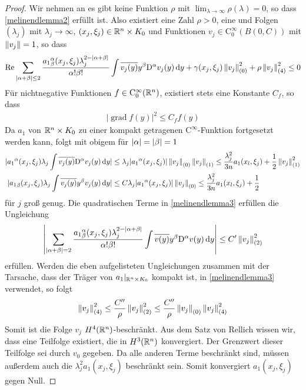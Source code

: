 \begin{proof}
Wir nehmen an es gibt keine Funktion $\rho$ mit $\lim_{\lambda\to\infty}\rho(\lambda)=0$, so dass \eqref{melinendlemma2} erfüllt ist. Also existiert eine Zahl $\rho>0$, eine und Folgen $(\lambda_j)$ mit $\lambda_j\to\infty$, $(x_j,\xi_j)\in\mathbb R^n\times K_0$ und Funktionen $v_j\in\mathrm C^\infty_0(B(0,C))$ mit $\left\lVert v_j\right\rVert =1$, so dass
\begin{align}\label{melinendlemma3}
\operatorname{Re} \sum_{|\alpha+\beta|\le 2} \frac{{a_1}^\alpha_\beta(x_j,\xi_j)\lambda_j^{2-|\alpha+\beta|}}{\alpha!\beta!}\int\overline{v_j(y)}y^\beta\mathrm D^\alpha v_j(y)\,\mathrm d y + \gamma(x_j,\xi_j)\left\lVert v_j\right\rVert_{(0)}^2 + \rho\left\lVert v_j\right\rVert _{(4)}^2 \le 0
\end{align}
Für nichtnegative Funktionen $f\in\mathrm C^\infty_0 (\mathbb R^n)$,  existiert stets eine Konstante $C_f$, so dass
\begin{align}
|\operatorname{grad}f(y)|^2\le C_f f(y)
\end{align}
Da $a_1$ von $\mathbb R^n\times K_0$ zu einer kompakt getragenen $\mathrm C^\infty$-Funktion fortgesetzt werden kann, folgt mit obigem für $\lvert\alpha\rvert=\lvert\beta\rvert=1$
\begin{align}
|{a_1}^\alpha(x_j,\xi_j)\lambda_j\int \overline{v_j(y)}\mathrm D^\alpha v_j(y)\,\mathrm d y| &\le \lambda_j|{a_1}^\alpha(x_j,\xi_j)|\left\lVert v_j\right\rVert_{(0)}\left\lVert v_j\right\rVert_{(1)} \le \frac{\lambda_j^2}{3n}a_1(x_l,\xi_j) + \frac 1 2\left\lVert v_j\right\rVert_{(1)}^2\\
|{a_1}_\beta(x_j,\xi_j)\lambda_j\int \overline{v_j(y)}y^\beta v_j(y)\,\mathrm d y| &\le C \lambda_j|{a_1}^\alpha(x_j,\xi_j)|\left\lVert v_j\right\rVert_{(0)} \le \frac{\lambda_j^2}{3n}a_1(x_l,\xi_j) + \frac 1 2
\end{align}
für $j$ groß genug. Die quadratischen Terme in \eqref{melinendlemma3} erfüllen die Ungleichung
\begin{align}
\left\lvert\sum_{|\alpha+\beta|= 2} \frac{{a_1}^\alpha_\beta(x_j,\xi_j)\lambda_j^{2-|\alpha+\beta|}}{\alpha!\beta!}\int\overline{v(y)}y^\beta\mathrm D^\alpha v(y)\,\mathrm d y\right\rvert\le C'\left\lVert v_j\right\rVert_{(2)}^2
\end{align}
erfüllen. Werden die eben aufgelisteten Ungleichungen zusammen mit der Tarsache, dass der Träger von $a_1|_{\mathbb R^n\times K_0}$ kompakt ist, in \eqref{melinendlemma3} verwendet, so folgt
\begin{align}
\left\lVert v_j\right\rVert_{(4)}^2\le \frac{C''}{\rho}\left\lVert v_j\right\rVert_{(2)}^2\le \frac{C''}{\rho}\left\lVert v_j\right\rVert_{(0)}\left\lVert v_j\right\rVert_{(4)}^2
\end{align}
Somit ist die Folge $v_j$ $H^4(\mathbb R^n)$-beschränkt. Aus dem Satz von Rellich wissen wir, dass eine Teilfolge existiert, die in $H^3(\mathbb R^n)$ konvergiert. Der Grenzwert dieser Teilfolge sei durch $v_0$ gegeben. Da alle anderen Terme beschränkt sind, müssen außerdem auch die $\lambda_j^2a_1(x_j,\xi_j)$ beschränkt sein. Somit konvergiert $a_1(x_j,\xi_j)$ gegen Null. 

\end{proof}
